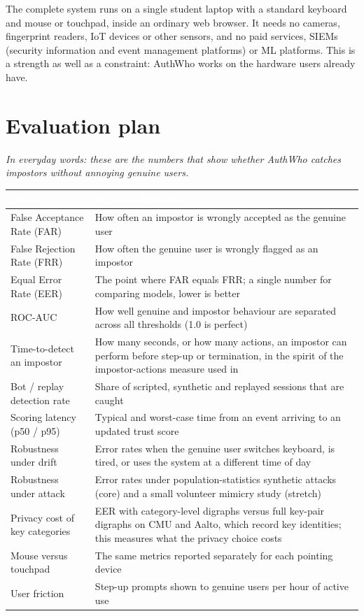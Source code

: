 \documentclass[10pt,letterpaper]{article}
\newcommand{\hd}[1]{\textcolor{white}{\bfseries #1}}
\newcommand{\headrow}{\rowcolor{navy}}
\begin{document}
The complete system runs on a single student laptop with a standard keyboard and mouse or touchpad, inside an ordinary web browser. It needs no cameras, fingerprint readers, IoT devices or other sensors, and no paid services, SIEMs (security information and event management platforms) or ML platforms. This is a strength as well as a constraint: AuthWho works on the hardware users already have.

\section{Evaluation plan}

\emph{In everyday words: these are the numbers that show whether AuthWho catches impostors without annoying genuine users.}

\begin{xltabular}{\textwidth}{P{4.3cm} L}
\headrow \hd{Metric} & \hd{What it measures} \\
\endhead
False Acceptance Rate (FAR) & How often an impostor is wrongly accepted as the genuine user \\ \hline
False Rejection Rate (FRR) & How often the genuine user is wrongly flagged as an impostor \\ \hline
Equal Error Rate (EER) & The point where FAR equals FRR; a single number for comparing models, lower is better \\ \hline
ROC-AUC & How well genuine and impostor behaviour are separated across all thresholds (1.0 is perfect) \\ \hline
Time-to-detect an impostor & How many seconds, or how many actions, an impostor can perform before step-up or termination, in the spirit of the impostor-actions measure used in \cite{mondal2017} \\ \hline
Bot / replay detection rate & Share of scripted, synthetic and replayed sessions that are caught \\ \hline
Scoring latency (p50 / p95) & Typical and worst-case time from an event arriving to an updated trust score \\ \hline
Robustness under drift & Error rates when the genuine user switches keyboard, is tired, or uses the system at a different time of day \\ \hline
Robustness under attack & Error rates under population-statistics synthetic attacks \cite{serwadda2013} (core) and a small volunteer mimicry study \cite{tey2013} (stretch) \\ \hline
Privacy cost of key categories & EER with category-level digraphs versus full key-pair digraphs on CMU and Aalto, which record key identities; this measures what the privacy choice costs \\ \hline
Mouse versus touchpad & The same metrics reported separately for each pointing device \\ \hline
User friction & Step-up prompts shown to genuine users per hour of active use \\
\end{xltabular}
\end{document}
